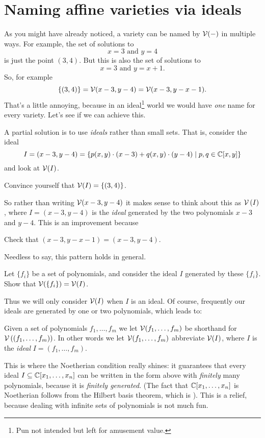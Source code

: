 \section{Naming affine varieties via ideals}
As you might have already noticed, a variety can be named by $\mathcal V(-)$ in multiple ways.
For example, the set of solutions to
\[ x=3 \text{ and } y=4 \]
is just the point $(3,4)$.
But this is also the set of solutions to
\[ x=3 \text{ and } y=x+1. \]
So, for example
\[ \{(3,4)\}
	= \mathcal V(x-3, y-4)
	= \mathcal V(x-3, y-x-1).
	\]
That's a little annoying, because in an ideal\footnote{Pun not intended
	but left for amusement value.}
world we would have \emph{one} name
for every variety.
Let's see if we can achieve this.

A partial solution is to use \emph{ideals} rather than small sets.
That is, consider the ideal
\[
	I = \left( x-3, y-4 \right)
	= \left\{ p(x,y) \cdot (x-3) + q(x,y) \cdot (y-4)
	\mid p,q \in \mathbb C[x,y] \right\}
\]
and look at $\mathcal V(I)$.
\begin{ques}
	Convince yourself that $\mathcal V(I) = \{(3,4)\}$.
\end{ques}
So rather than writing $\mathcal V(x-3, y-4)$ it makes sense to
think about this as $\mathcal V\left( I \right)$, where $I = (x-3,y-4)$ is the \emph{ideal}
generated by the two polynomials $x-3$ and $y-4$.
This is an improvement because
\begin{ques}
	Check that $(x-3, y-x-1) = (x-3, y-4)$.
\end{ques}

Needless to say, this pattern holds in general.
\begin{ques}
	Let $\{f_i\}$ be a set of polynomials, and consider
	the ideal $I$ generated by these $\{f_i\}$.
	Show that $\mathcal V(\{f_i\}) = \mathcal V(I)$.
\end{ques}

Thus we will only consider $\mathcal V(I)$ when $I$ is an ideal.
Of course, frequently our ideals are generated by one or two polynomials,
which leads to:
\begin{abuse}
	Given a set of polynomials $f_1, \dots, f_m$
	we let $\mathcal V(f_1, \dots, f_m)$ be shorthand for
	$\mathcal V\left( \left( f_1, \dots, f_m \right) \right)$.
	In other words we let $\mathcal V(f_1, \dots, f_m)$
	abbreviate $\mathcal V(I)$, where $I$ is the \emph{ideal} $I=(f_1, \dots, f_m)$.
\end{abuse}

This is where the Noetherian condition really shines:
it guarantees that every ideal $I \subseteq \mathbb C[x_1, \dots, x_n]$
can be written in the form above with \emph{finitely} many polynomials,
because it is \emph{finitely generated}.
(The fact that $\mathbb C[x_1, \dots, x_n]$ is Noetherian follows from the Hilbert basis theorem,
which is ).
This is a relief, because dealing with infinite sets of polynomials is not much fun.

